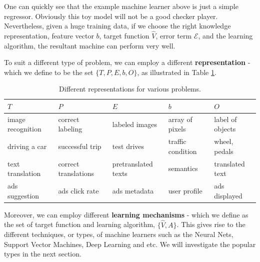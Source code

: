 \documentclass[12pt]{article}  %
\begin{document}
One can quickly see that the example machine learner above is just a simple regressor. Obviously this toy model will not be a good checker player. Nevertheless, given a huge training data, if we choose the right knowledge representation, feature vector $b$, target function $\hat{V}$, error term $\mathcal{E}$, and the learning algorithm, the resultant machine can perform very well. 

To suit a different type of problem, we can employ a different {\bf representation} - which we define to be the set $\{T, P, E, b, O\}$, as illustrated in Table \ref{rep}.



\begin{table}[ht]
\begin{center}
\begin{tabular}{ | l | l | l || l | l | }

\hline
$T$ & $P$ & $E$ & $b$ & $O$ \\
\hline \hline
image recognition & correct labeling & labeled images & array of pixels & label of objects \\
\hline
driving a car & successful trip & test drives & traffic condition & wheel, pedals  \\
\hline
text translation & correct translations & pretranslated texts & semantics & translated text \\
\hline
ads suggestion & ads click rate & ads metadata & user profile & ads displayed \\
\hline
\end{tabular}
\caption{Different representations for various problems.}
\label{rep}
\end{center}
\end{table}



Moreover, we can employ different {\bf learning mechanisms} - which we define as the set of target function and learning algorithm, $\{\hat{V}, A\}$. This gives rise to the different techniques, or types, of machine learners such as the Neural Nets, Support Vector Machines, Deep Learning and etc. We will investigate the popular types in the next section.
\end{document}
